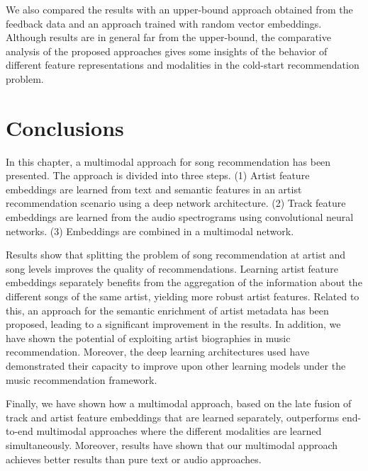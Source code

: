 We also compared the results with an upper-bound approach obtained from the feedback data and an approach trained with random vector embeddings. Although results are in general far from the upper-bound, the comparative analysis of the proposed approaches gives some insights of the behavior of different feature representations and modalities in the cold-start recommendation problem.



\section{Conclusions}
\label{sec:cold-rec:conclusions}

In this chapter, a multimodal approach for song recommendation has been presented. The approach is divided into three steps. (1) Artist feature embeddings are learned from text and semantic features in an artist recommendation scenario using a deep network architecture. (2) Track feature embeddings are learned from the audio spectrograms using convolutional neural networks. (3) Embeddings are combined in a multimodal network.

Results show that splitting the problem of song recommendation at artist and song levels improves the quality of recommendations. 
Learning artist feature embeddings separately benefits from the aggregation of the information about the different songs of the same artist, yielding more robust artist features. 
Related to this, an approach for the semantic enrichment of artist metadata has been proposed, leading to a significant improvement in the results. 
In addition, we have shown the potential of exploiting artist biographies in music recommendation. 
Moreover, the deep learning architectures used have demonstrated their capacity to improve upon other learning models under the music recommendation framework. 

Finally, we have shown how a multimodal approach, based on the late fusion of track and artist feature embeddings that are learned separately, outperforms end-to-end multimodal approaches where the different modalities are learned simultaneously. Moreover, results have shown that our multimodal approach achieves better results than pure text or audio approaches. 
